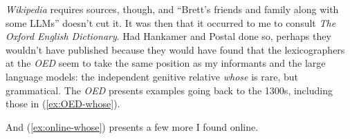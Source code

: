 \textit{Wikipedia} requires sources, though, and \enquote{Brett's friends and family along with some LLMs} doesn't cut it. It was then that it occurred to me to consult \textit{The Oxford English Dictionary}. Had Hankamer and Postal done so, perhaps they wouldn't have published because they would have found that the lexicographers at the \textit{OED} seem to take the same position as my informants and the large language models: the independent genitive relative \textit{whose} is rare, but grammatical. The \textit{OED} presents examples going back to the 1300s, including those in (\ref{ex:OED-whose}). %

\ea \label{ex:OED-whose}
 \z
\z

\noindent And (\ref{ex:online-whose}) presents a few more I found online.


